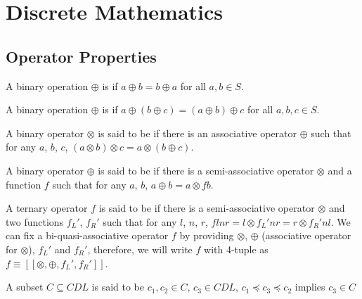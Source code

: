 \chapter{Discrete Mathematics}

\section{Operator Properties}

\begin{defi}
A binary operation $\oplus$ is  if $a\oplus b = b\oplus a$ for all $a,b\in S$.\cite{Oppliger:2011:CC:2049860}
\end{defi}

\begin{defi}
A binary operation $\oplus$ is  if $a\oplus\left(b\oplus c\right) = \left(a\oplus b\right)\oplus c$ for all $a,b,c\in S$.\cite{Oppliger:2011:CC:2049860}
\end{defi}

\begin{defi}
A binary operator $\otimes$ is said to be  if there is an associative operator $\oplus$ such that for any $a$, $b$, $c$, $\left(a\otimes b\right)\otimes c = a\otimes\left(b\oplus c\right)$.\cite{conf/europar/MatsuzakiHT03}
\end{defi}

\begin{defi}
A binary operator $\oplus$ is said to be  if there is a semi-associative operator $\otimes$ and a function $f$ such that for any $a$, $b$, $a\oplus b = a\otimes f b$.\cite{conf/europar/MatsuzakiHT03}
\end{defi}

\begin{defi}
A ternary operator $f$ is said to be  if there is a semi-associative operator $\otimes$ and two functions $f_L'$, $f_R'$ such that for any $l$, $n$, $r$, $f l n r = l \otimes f_L' n r = r \otimes f_R' n l$. We can fix a bi-quasi-associative operator $f$ by providing $\otimes$, $\oplus$ (associative operator for $\otimes$), $f_L'$ and $f_R'$, therefore, we will write $f$ with 4-tuple as $f\equiv \left[\left[\otimes,\oplus, f_L', f_R' \right]\right]$.\cite{conf/europar/MatsuzakiHT03}
\end{defi}

\begin{defi}
A subset $C\subseteq CDL$ is said to be  \iffTx{} \faTx{} $c_1,c_2\in C$, $c_3\in CDL$, $c_1\preceq c_3\preceq c_2$ implies $c_3\in C$
\cite{conf/ijcai/Hirsh91}
\end{defi}

